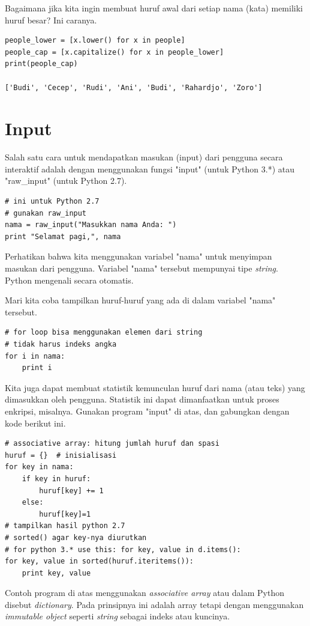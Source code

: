 Bagaimana jika kita ingin membuat huruf awal dari setiap nama (kata)
memiliki huruf besar? Ini caranya.

\begin{verbatim}
people_lower = [x.lower() for x in people]
people_cap = [x.capitalize() for x in people_lower]
print(people_cap)

['Budi', 'Cecep', 'Rudi', 'Ani', 'Budi', 'Rahardjo', 'Zoro']
\end{verbatim}

\section{Input}
Salah satu cara untuk mendapatkan masukan (input) dari pengguna secara
interaktif adalah dengan menggunakan fungsi "input" (untuk Python 3.*)
atau "raw\_input" (untuk Python 2.7).

\begin{verbatim}
# ini untuk Python 2.7
# gunakan raw_input
nama = raw_input("Masukkan nama Anda: ")
print "Selamat pagi,", nama
\end{verbatim}

Perhatikan bahwa kita menggunakan variabel "nama" untuk menyimpan masukan
dari pengguna. Variabel "nama" tersebut mempunyai tipe {\em string}.
Python mengenali secara otomatis.

Mari kita coba tampilkan huruf-huruf yang ada di dalam variabel "nama"
tersebut.

\begin{verbatim}
# for loop bisa menggunakan elemen dari string
# tidak harus indeks angka
for i in nama:
    print i
\end{verbatim}

Kita juga dapat membuat statistik kemunculan huruf dari nama (atau teks)
yang dimasukkan oleh pengguna. Statistik ini dapat dimanfaatkan untuk
proses enkripsi, misalnya. Gunakan program "input" di atas, dan gabungkan
dengan kode berikut ini.

\begin{verbatim}
# associative array: hitung jumlah huruf dan spasi
huruf = {}  # inisialisasi
for key in nama:
    if key in huruf:
        huruf[key] += 1
    else:
        huruf[key]=1
# tampilkan hasil python 2.7
# sorted() agar key-nya diurutkan
# for python 3.* use this: for key, value in d.items():
for key, value in sorted(huruf.iteritems()):
    print key, value
\end{verbatim}

Contoh program di atas menggunakan {\em associative array} atau dalam
Python disebut {\em dictionary}. Pada prinsipnya ini adalah array tetapi
dengan menggunakan {\em immutable object} seperti {\em string} sebagai
indeks atau kuncinya.

